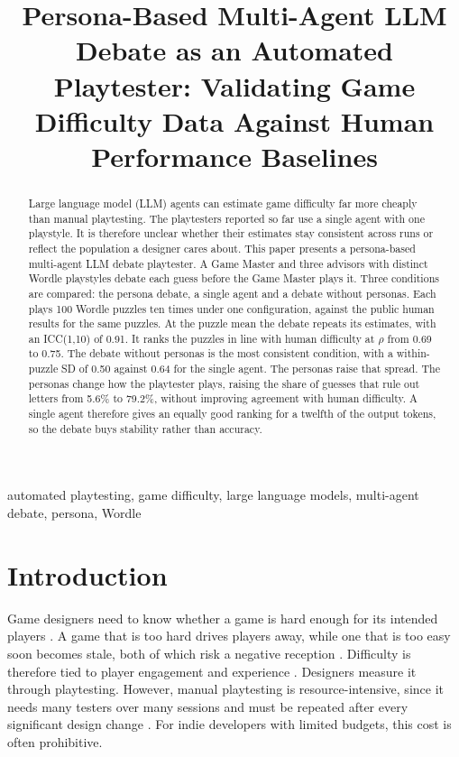 \documentclass[conference]{IEEEtran}
\title{Persona-Based Multi-Agent LLM Debate as an Automated Playtester:
Validating Game Difficulty Data Against Human Performance Baselines}
\author{\IEEEauthorblockN{Muhammad Haydar Maulana}
\IEEEauthorblockA{Master of Informatics\\
Email: haydariday@gmail.com}}
\begin{document}
\maketitle

\begin{abstract}
Large language model (LLM) agents can estimate game difficulty far more cheaply than manual playtesting. The playtesters reported so far use a single agent with one playstyle. It is therefore unclear whether their estimates stay consistent across runs or reflect the population a designer cares about. This paper presents a persona-based multi-agent LLM debate playtester. A Game Master and three advisors with distinct Wordle playstyles debate each guess before the Game Master plays it. Three conditions are compared: the persona debate, a single agent and a debate without personas. Each plays 100 Wordle puzzles ten times under one configuration, against the public human results for the same puzzles. At the puzzle mean the debate repeats its estimates, with an ICC(1,10) of 0.91. It ranks the puzzles in line with human difficulty at $\rho$ from 0.69 to 0.75. The debate without personas is the most consistent condition, with a within-puzzle SD of 0.50 against 0.64 for the single agent. The personas raise that spread. The personas change how the playtester plays, raising the share of guesses that rule out letters from 5.6\% to 79.2\%, without improving agreement with human difficulty. A single agent therefore gives an equally good ranking for a twelfth of the output tokens, so the debate buys stability rather than accuracy.
\end{abstract}

\begin{IEEEkeywords}
automated playtesting, game difficulty, large language models, multi-agent debate, persona, Wordle
\end{IEEEkeywords}

\section{Introduction}
\label{sec:introduction}

Game designers need to know whether a game is hard enough for its intended players \cite{weber2020}. A game that is too hard drives players away, while one that is too easy soon becomes stale, both of which risk a negative reception \cite{karavidas2022}. Difficulty is therefore tied to player engagement and experience \cite{romero2023,alvarado2021}. Designers measure it through playtesting. However, manual playtesting is resource-intensive, since it needs many testers over many sessions and must be repeated after every significant design change \cite{weber2020,prasetya2026,zhao2025}. For indie developers with limited budgets, this cost is often prohibitive.
\end{document}

